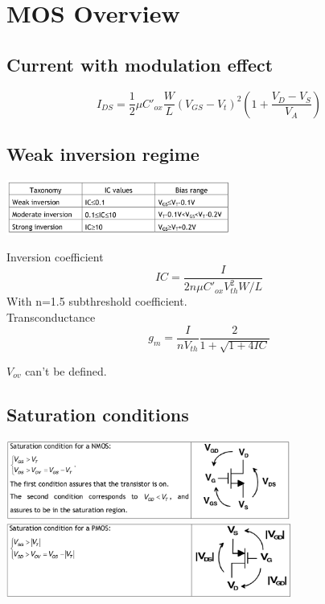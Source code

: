 \chapter{MOS Overview}

\section{Current with modulation effect}

\begin{equation}
I_{DS}=\frac{1}{2}\mu C'_{ox}\frac{W}{L}(V_{GS}-V_t)^2 (1+\frac{V_D-V_S}{V_A})
\end{equation}

\section{Weak inversion regime}

\centering
\includegraphics[width=0.55\textwidth]{Schermata.png}\\
\raggedright

Inversion coefficient
\begin{equation}
IC=\frac{I}{2n\mu C'_{ox}V_{th}^2 W/L}
\end{equation}
With n=1.5 subthreshold coefficient.\\

Transconductance
\begin{equation}
g_m=\frac{I}{nV_{th}}\frac{2}{1+\sqrt{1+4IC}}
\end{equation}

$V_{ov}$ can't be defined.\\



\section{Saturation conditions}

\centering
\includegraphics[width=0.7\textwidth]{nmossat.png}\\
\includegraphics[width=0.7\textwidth]{pmossat.png}\\
\raggedright


